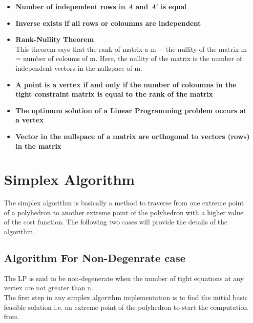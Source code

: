 \documentclass[a4paper,12pt]{report}
\begin{document}
\begin{itemize}
\item \textbf{Number of independent rows in $A$ and $A'$ is equal}
\item \textbf{Inverse exists if all rows or coloumns are independent}
\item \textbf{Rank-Nullity Theorem}\\
This theorem says that the rank of matrix a m + the nullity of the matrix m = number of coloums of m. Here, the nullity of the matrix is the number of independent vectors in the nullspace of m.
\item \textbf{A point is a vertex if and only if the number of coloumns in the tight constraint matrix is equal to the rank of the matrix}
\item \textbf{The optimum solution of a Linear Programming problem occurs at a vertex}
\item \textbf{Vector in the nullspace of a matrix are orthogonal to vectors (rows) in the matrix}
\end{itemize}
\section{Simplex Algorithm}
The simplex algorithm is basically a method to traverse from one extreme point of a polyhedron to another extreme point of the polyhedron with a higher value of the cost function. The following two cases will provide the details of the algorithm.
\subsection{Algorithm For Non-Degenrate case}
The LP is said to be non-degenerate when the number of tight equations at any vertex are not greater than n.\\
The first step in any simplex algorithm implementation is to find the initial basic feasible solution i.e. an extreme point of the polyhedron to start the computation from.
\end{document}

